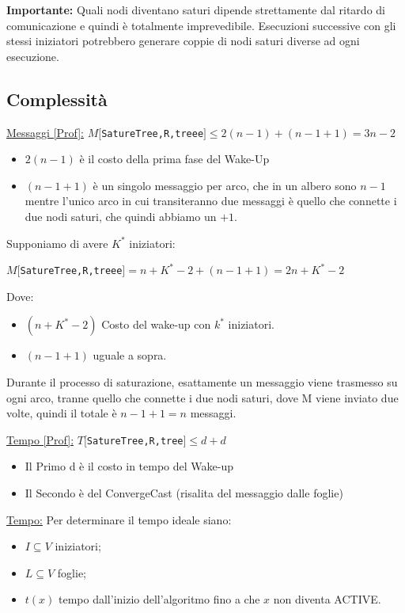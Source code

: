 \textbf{Importante:} Quali nodi diventano saturi dipende strettamente dal
ritardo di comunicazione e quindi è totalmente imprevedibile. Esecuzioni
successive con gli stessi iniziatori potrebbero generare coppie di nodi saturi
diverse ad ogni esecuzione.

\subsection{Complessità}
\underline{Messaggi [Prof]:}
$M[$\texttt{SatureTree,R,treee}$] \leq 2(n-1) + (n-1+1) = 3n - 2$
\begin{itemize}
    \item $2(n-1)$ è il costo della prima fase del Wake-Up
    \item $(n-1+1)$ è un singolo messaggio per arco, che in un albero sono $n-1$
          mentre l'unico arco in cui transiteranno due messaggi è quello che connette i
          due nodi saturi, che quindi abbiamo un $+1$.
\end{itemize}
Supponiamo di avere $K^*$ iniziatori:
\begin{center}
    $M[$\texttt{SatureTree,R,treee}$] = n + K^* - 2 + (n-1+1) = 2n + K^* -2$\\
\end{center}
Dove:
\begin{itemize}
    \item $(n + K^* - 2)$ Costo del wake-up con $k^*$ iniziatori.
    \item $(n-1+1)$ uguale a sopra.
\end{itemize}

Durante il processo di saturazione, esattamente un messaggio viene trasmesso su
ogni arco, tranne quello che connette i due nodi saturi, dove M viene inviato
due volte, quindi il totale è $n-1+1 = n$ messaggi.


\underline{Tempo [Prof]:}
$T[$\texttt{SatureTree,R,tree}$] \leq d + d$
\begin{itemize}
    \item Il Primo d è il costo in tempo del Wake-up
    \item Il Secondo è del ConvergeCast (risalita del messaggio dalle foglie)
\end{itemize}
\underline{Tempo:}
Per determinare il tempo ideale siano:
\begin{itemize}
    \item $I \subseteq V$ iniziatori;
    \item $L \subseteq V$ foglie;
    \item $t(x)$ tempo dall'inizio dell'algoritmo fino a che $x$ non diventa
          ACTIVE.
\end{itemize}

